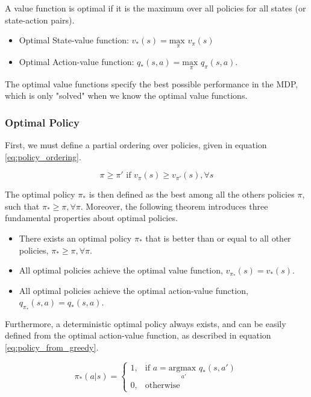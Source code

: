 A value function is optimal if it is the maximum over all policies for all states (or state-action pairs).
\begin{itemize}
\item
	Optimal State-value function: $v_*(s) = \underset{\pi}{\textrm{max }} v_\pi(s)$
\item
	Optimal Action-value function: $q_*(s, a) = \underset{\pi}{\textrm{max }} q_\pi(s, a)$.
\end{itemize}

The optimal value functions specify the best possible performance in the MDP, which is only "solved" when we know the optimal value functions.

\subsubsection{Optimal Policy}

First, we must define a partial ordering over policies, given in equation \ref{eq:policy_ordering}.

\begin{equation}
\pi \geq \pi' \text{ if } v_{\pi}(s) \geq v_{\pi'}(s), \forall s
\label{eq:policy_ordering}
\end{equation}

The optimal policy $\pi_*$ is then defined as the best among all the others policies $\pi$, such that $\pi_* \geq \pi, \forall \pi$. Moreover, the following theorem introduces three fundamental properties about optimal policies.

\begin{itemize}
\item
There exists an optimal policy $\pi_*$ that is better than or equal to all other policies, $\pi_* \geq \pi, \forall \pi$.
\item
All optimal policies achieve the optimal value function, $v_{\pi_*}(s) = v_*(s)$.
\item
All optimal policies achieve the optimal action-value function, $q_{\pi_*}(s,a) = q_*(s,a)$.
\end{itemize}

Furthermore, a deterministic optimal policy always exists, and can be easily defined from the optimal action-value function, as described in equation \ref{eq:policy_from_greedy}.

\begin{equation}
 \pi_*(a | s) = 
\begin{cases}
    1,& \text{if } a = \underset{a'}{\textrm{argmax }} q_*(s,a')\\
    0,& \text{otherwise}
\end{cases}
\label{eq:policy_from_greedy}
\end{equation}

